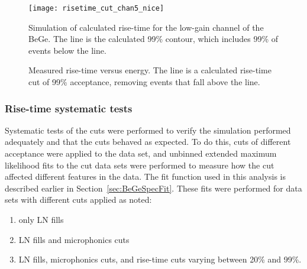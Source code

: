 				\begin{figure}
					\centering
					\texttt{[image: risetime\_cut\_chan5\_nice]}
					\caption[Simulation of calculated rise-time for the low-gain channel of the BeGe]
					{Simulation of calculated rise-time for the low-gain channel of the BeGe.  
					The line is the calculated 99\% contour, which includes 99\% of events below the line.}
					\label{fig:RisetimeSimulation}
				\end{figure}	
	
				\begin{figure}
					\centering
					\def\plotwidth{0.8\textwidth}					
					\caption[Measured rise-time versus energy with a calculated rise-time cut of 99\% acceptance]
					{Measured rise-time versus energy.  The line is a calculated rise-time cut of 99\% acceptance, 
					removing events that fall above the line.}
					\label{fig:RisetimeDataVsCut}
				\end{figure}	
	
		\subsubsection{Rise-time systematic tests}
		\label{sec:RisetimeSystematicTests}	
	
	Systematic tests of the cuts were performed to verify the simulation performed adequately and that the cuts behaved as expected.  To do this, cuts of different acceptance were applied to the data set, and unbinned extended maximum likelihood fits to the cut data sets were performed to measure how the cut affected different features in the data.  The fit function used in this analysis is described earlier in Section~\ref{sec:BeGeSpecFit}.  These fits were performed for data sets with different cuts applied as noted:

					\begin{enumerate}
						\item only LN fills 
						\item LN fills and microphonics cuts
						\item LN fills, microphonics cuts, and rise-time cuts varying between 20\% and 99\%.
					\end{enumerate}

